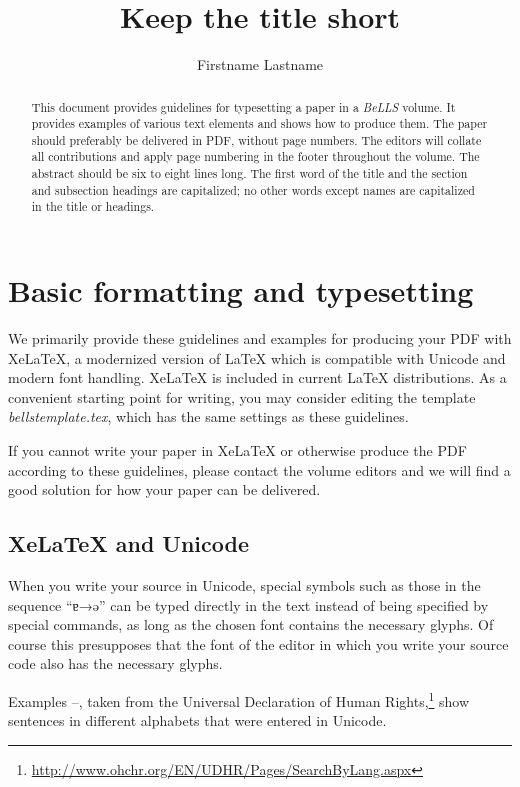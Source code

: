 \documentclass[11pt,twoside]{article}
\author{Firstname Lastname} %
\title{Keep the title short} %
\begin{document}
\maketitle

\begin{abstract}
This document provides guidelines for typesetting a paper in a \emph{BeLLS} volume.
It provides examples of various text elements and shows how to produce them.
The paper should preferably be delivered in PDF, without page numbers.
The editors will collate all contributions and apply page numbering in the footer throughout the volume.
The abstract should be six to eight lines long.
The first word of the title and the section and subsection headings are capitalized; no other words except names are capitalized in the title or headings.
\end{abstract}

\section{Basic formatting and typesetting}

We primarily provide these guidelines and examples for producing your PDF with XeLaTeX, a modernized version of LaTeX which is compatible with Unicode and modern font handling.
XeLaTeX is included in current LaTeX distributions.
As a convenient starting point for writing, you may consider editing the template \emph{bellstemplate.tex}, which has the same settings as these guidelines.

If you cannot write your paper in XeLaTeX or otherwise produce the PDF according to these guidelines, please contact the volume editors and we will find a good solution for how your paper can be delivered.

\subsection{XeLaTeX and Unicode}\label{fontexamples}

When you write your source in Unicode, special symbols such as those in the sequence “ɐ→ə” can be typed directly in the text instead of being specified by special commands, as long as the chosen font contains the necessary glyphs.
Of course this presupposes that the font of the editor in which you write your source code also has the necessary glyphs.

Examples –, taken from the Universal Declaration of Human Rights,\footnote{\url{http://www.ohchr.org/EN/UDHR/Pages/SearchByLang.aspx}} show sentences in different alphabets that were entered in Unicode.
\end{document}
